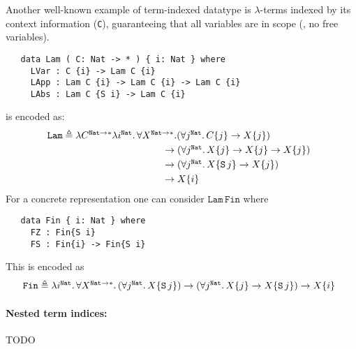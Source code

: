 \begin{example} Another well-known example of term-indexed datatype
        is \mbox{$\lambda$-terms} indexed by its context information
        (\texttt{C}), guaranteeing that all variables are in scope
        (\ie, no free variables).
\begin{verbatim}
   data Lam ( C: Nat -> * ) { i: Nat } where
     LVar : C {i} -> Lam C {i}
     LApp : Lam C {i} -> Lam C {i} -> Lam C {i}
     LAbs : Lam C {S i} -> Lam C {i}
\end{verbatim}
is encoded as:
\[
\mathtt{Lam} \triangleq
\!\!\!
\begin{array}[t]{l}
\lambda C^{\mathtt{Nat}\to*}
\lambda i^\mathtt{Nat}.\,\forall X^{\mathtt{Nat}\to*}.
  (\forall j^\mathtt{Nat}.\,C\{j\} \to X\{j\})
\\[1mm]
\qquad\qquad\qquad\qquad\quad\,
 \to(\forall j^\mathtt{Nat}.\,X\{j\} \to X\{j\} \to X\{j\})
\\[1mm]
\qquad\qquad\qquad\qquad\quad\,
\to(\forall j^\mathtt{Nat}.\,X\{\mathtt S\, j\} \to X\{j\})
\\[1mm]
\qquad\qquad\qquad\qquad\quad\,
  \to X\{i\}
\end{array}
\]
For a concrete representation one can consider
$\mathtt{Lam}\,\mathtt{Fin}$ where
\begin{verbatim}
   data Fin { i: Nat } where
     FZ : Fin{S i}
     FS : Fin{i} -> Fin{S i}
\end{verbatim}
This is encoded as
\[
\mathtt{Fin}\triangleq
\!\!\!
\begin{array}[t]{l}
\lambda i^{\mathtt{Nat}}.\,\forall X^{\mathtt{Nat}\to*}.\,
(\forall j^\mathtt{Nat}.\, X\{\mathtt S\, j\})
        \to (\forall j^\mathtt{Nat}.\, X\{j\}\to X\{\mathtt S\,j\})
        \to X\{i\}
\end{array}
\]
\end{example}

\paragraph{Nested term indices:}
TODO



